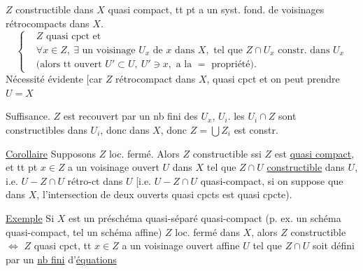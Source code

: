 $Z$ constructible dans $X$ quasi compact,  tt pt a un syst. fond. de voisinages rétrocompacts dans $X$.
\[
\left\{\begin{aligned}
&Z\text{ quasi cpct et}\\
&\forall x\in Z,\ \exists\text{ un voisinage }U_x\text{ de }x\text{ dans }X,\text{ tel que }Z\cap U_x\text{ constr. dans }U_x\\
&\text{(alors tt ouvert }U'\subset U,\ U'\ni x,\text{ a la }=\text{ propriété)}.
\end{aligned}\right.
\]
Nécessité évidente [car $Z$ rétrocompact dans $X$,  quasi cpct et on peut prendre $U=X$

Suffisance. $Z$ est recouvert par un nb fini des $U_x$,  $U_i$. les $U_i\cap Z$ sont constructibles dans $U_i$, donc dans $X$, donc $Z=\bigcup Z_i$ est constr.

\uline{Corollaire} Supposons $Z$ loc. fermé. Alors $Z$  constructible ssi $Z$ est \uline{quasi compact}, et tt pt $x\in Z$ a un voisinage ouvert $U$ dans $X$ tel que $Z\cap U$   \uline{constructible} dans $U$, i.e. $U-Z\cap U$ rétro-ct dans $U$ [i.e. $U-Z\cap U$ quasi-compact, si on  suppose que dans $X$, l'intersection de deux ouverts quasi cpcts est quasi cpcte).

\uline{Exemple} Si $X$ est un préschéma quasi-séparé quasi-compact (p. ex. un schéma quasi-compact, tel un schéma affine)  $Z$ loc. fermé dans $X$, alors $Z$ constructible $\Longleftrightarrow$ $Z$ quasi cpct,  tt $x\in Z$ a un voisinage ouvert affine $U$ tel que $Z\cap U$ soit défini par un \uline{nb fini} d'\uline{équations}

